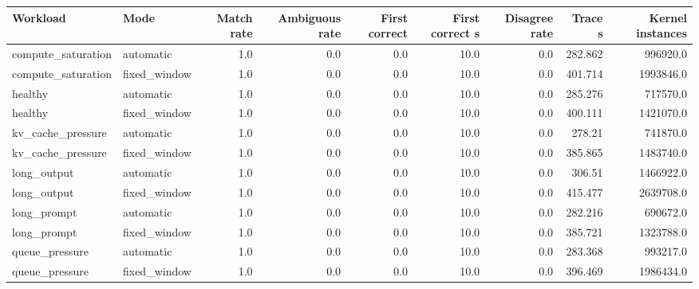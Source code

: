 \begin{tabular}{llrrrrrrr}
\hline
Workload & Mode & Match rate & Ambiguous rate & First correct & First correct s & Disagree rate & Trace s & Kernel instances \\
\hline
compute_saturation & automatic & 1.0 & 0.0 & 0.0 & 10.0 & 0.0 & 282.862 & 996920.0 \\
compute_saturation & fixed_window & 1.0 & 0.0 & 0.0 & 10.0 & 0.0 & 401.714 & 1993846.0 \\
healthy & automatic & 1.0 & 0.0 & 0.0 & 10.0 & 0.0 & 285.276 & 717570.0 \\
healthy & fixed_window & 1.0 & 0.0 & 0.0 & 10.0 & 0.0 & 400.111 & 1421070.0 \\
kv_cache_pressure & automatic & 1.0 & 0.0 & 0.0 & 10.0 & 0.0 & 278.21 & 741870.0 \\
kv_cache_pressure & fixed_window & 1.0 & 0.0 & 0.0 & 10.0 & 0.0 & 385.865 & 1483740.0 \\
long_output & automatic & 1.0 & 0.0 & 0.0 & 10.0 & 0.0 & 306.51 & 1466922.0 \\
long_output & fixed_window & 1.0 & 0.0 & 0.0 & 10.0 & 0.0 & 415.477 & 2639708.0 \\
long_prompt & automatic & 1.0 & 0.0 & 0.0 & 10.0 & 0.0 & 282.216 & 690672.0 \\
long_prompt & fixed_window & 1.0 & 0.0 & 0.0 & 10.0 & 0.0 & 385.721 & 1323788.0 \\
queue_pressure & automatic & 1.0 & 0.0 & 0.0 & 10.0 & 0.0 & 283.368 & 993217.0 \\
queue_pressure & fixed_window & 1.0 & 0.0 & 0.0 & 10.0 & 0.0 & 396.469 & 1986434.0 \\
\hline
\end{tabular}
